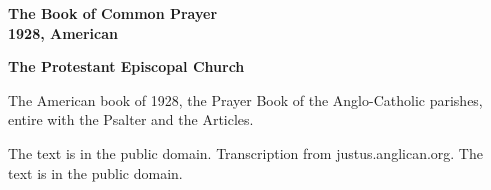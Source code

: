 \documentclass[11pt,letterpaper]{article}
\begin{document}
\color{ink}

\begin{titlepage}
\centering
\vspace*{4em}
{\LARGE\bfseries\color{heading} The Book of Common Prayer\\[0.3em]1928, American\par}
\vspace{2em}
{\Large\bfseries\color{heading} The Protestant Episcopal Church\par}
\vspace{2.5em}
{\itshape\color{subhead}\parbox{0.8\linewidth}{\centering The American book of 1928, the Prayer Book of the Anglo-Catholic parishes, entire with the Psalter and the Articles.\par}}
\vfill
{\small The text is in the public domain. Transcription from justus.anglican.org. The text is in the public domain.\par}
\vspace{2em}
\end{titlepage}

\tableofcontents


\end{document}
